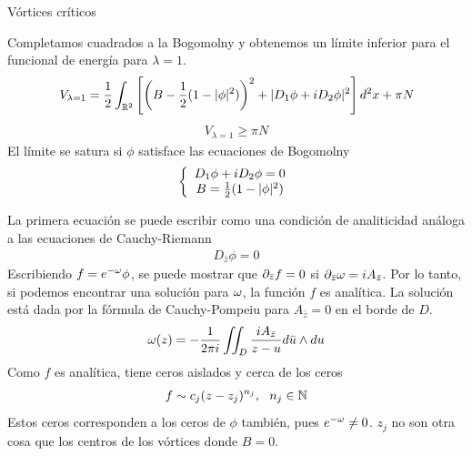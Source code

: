 \documentclass[11pt,t]{beamer}
\begin{document}
\begin{frame}{Vórtices críticos}

Completamos cuadrados a la Bogomolny y obtenemos un límite inferior para el funcional de energía para $\lambda=1$.
 \begin{align}
     V_{\lambda=1} = \frac{1}{2}\int_{\mathbb{R}^2}\left[\left(B-\frac{1}{2}(1-|\phi|^2)\right)^2+|D_1\phi+iD_2\phi|^2\right]d^2x+ \pi N 
 \end{align}
 \begin{align}
 V_{\lambda=1}\geq \pi N
 \end{align}
El límite se satura si $\phi$ satisface las ecuaciones de Bogomolny
 \begin{align}
     \left\{\begin{array}{c}
          D_1\phi+iD_2\phi = 0  \\
          B = \frac{1}{2}(1-|\phi|^2)
     \end{array}\right.
 \end{align}

\end{frame}

\begin{frame}

La primera ecuación se puede escribir como una condición de analiticidad análoga a las ecuaciones de Cauchy-Riemann
\begin{align}
D_{\bar z}\phi =0
\end{align}
Escribiendo $f=e^{-\omega}\phi$, se puede mostrar que $\partial_{\bar z}f=0$ si $\partial_{\bar z}\omega= i A_{\bar z}$. Por lo tanto, si podemos encontrar una solución para $\omega$, la función $f$ es analítica. La solución está dada por la fórmula de Cauchy-Pompeiu para $A_{\bar z}=0$ en el borde de $D$.
\begin{align}
\omega(z) = -\frac{1}{2\pi i}\iint_D \frac{iA_{\bar z}}{z-u}d\bar u\wedge du
\end{align}
Como $f$ es analítica, tiene ceros aislados y cerca de los ceros
\begin{align}
f\sim c_j(z-z_j)^{n_j}, \ \ n_j\in\mathbb{N}
\end{align}
Estos ceros corresponden a los ceros de $\phi$ también, pues $e^{-\omega}\neq 0$. $z_j$ no son otra cosa que los centros de los vórtices donde $B=0$.

\end{frame}
\end{document}
